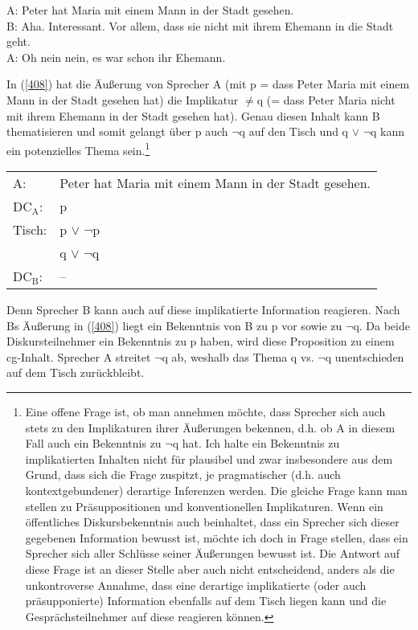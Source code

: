 \begin{exe}
	\ex\label{408} 
	A: Peter hat Maria mit einem Mann in der Stadt gesehen.\\
	B: Aha. Interessant. Vor allem, dass sie nicht mit ihrem Ehemann in die Stadt geht.\\
	A: Oh nein nein, es war schon ihr Ehemann.
\end{exe}
In (\ref{408}) hat die Äußerung von Sprecher A (mit p = dass Peter Maria mit einem Mann in der Stadt gesehen hat) die Implikatur $\neq$q (= dass Peter Maria nicht mit ihrem Ehemann in der Stadt gesehen hat). Genau diesen Inhalt kann B thematisieren und somit gelangt über p auch $\neg$q auf den Tisch und q $\vee$ $\neg$q kann ein potenzielles Thema sein.\footnote{\label{Fn16}Eine offene Frage ist, ob man annehmen möchte, dass Sprecher sich auch stets zu den Implikaturen ihrer Äußerungen bekennen, d.h. ob A in diesem Fall auch ein Bekenntnis zu $\neg$q hat. Ich halte ein Bekenntnis zu implikatierten Inhalten nicht für plausibel und zwar insbesondere aus dem Grund, dass sich die Frage zuspitzt, je pragmatischer (d.h. auch kontextgebundener) derartige Inferenzen werden. Die gleiche Frage kann man stellen zu Präsuppositionen und konventionellen Implikaturen. Wenn ein öffentliches Diskursbekenntnis auch beinhaltet, dass ein Sprecher sich dieser gegebenen Information bewusst ist, möchte ich doch in Frage stellen, dass ein Sprecher sich aller Schlüsse seiner Äußerungen bewusst ist. Die Antwort auf diese Frage ist an dieser Stelle aber auch nicht entscheidend, anders als die unkontroverse Annahme, dass eine derartige implikatierte (oder auch präsupponierte) Information ebenfalls auf dem Tisch liegen kann und die Gesprächsteilnehmer auf diese reagieren können.}
	
\begin{exe}
	\ex\label{409}
     \begin{tabular}[t]{ll}
     		A: & Peter hat Maria mit einem Mann in der Stadt gesehen.\\
            DC$_{\textrm{A}}$: & p\\
            Tisch: & p $\vee$ $\neg$p\\
 			 & q $\vee$ $\neg$q\\
 			DC$_{\textrm{B}}$: & --
      \end{tabular}
\end{exe}	
Denn Sprecher B kann auch auf diese implikatierte  Information reagieren. Nach Bs Äußerung in (\ref{408}) liegt ein Bekenntnis von B zu p vor sowie zu $\neg$q. Da beide Diskursteilnehmer ein Bekenntnis zu p haben, wird diese Proposition zu einem cg-Inhalt. Sprecher A streitet $\neg$q ab, weshalb das Thema q vs. $\neg$q unentschieden auf dem Tisch zurückbleibt. 

